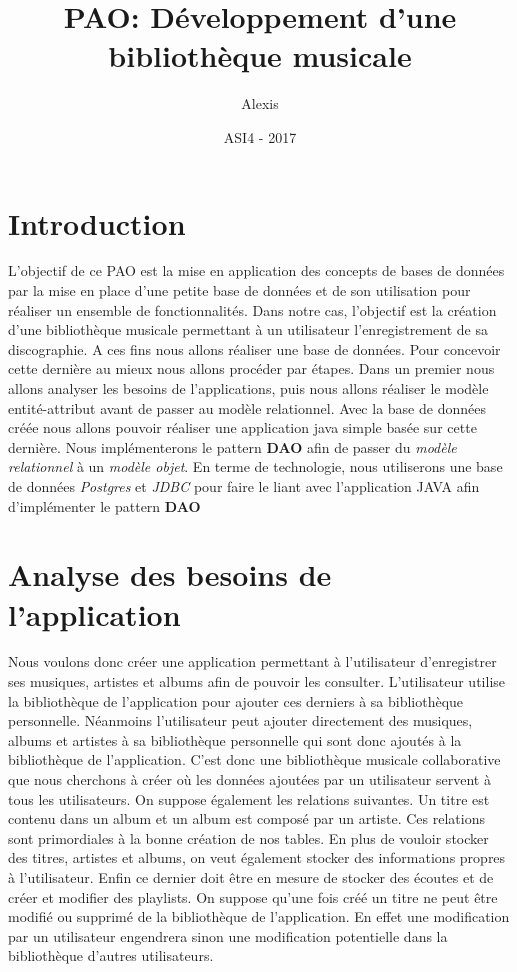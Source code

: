 \documentclass[a4paper,12pt, french]{report}
\title{PAO: Développement d'une bibliothèque musicale}
\author{Alexis \bsc{Durieux}}
\date{ASI4 - 2017}
\begin{document}
\maketitle
\tableofcontents

\chapter*{Introduction}
L'objectif de ce PAO est la mise en application des concepts de bases de données par la mise en place d'une petite base de données et de son utilisation pour réaliser un ensemble de fonctionnalités. Dans notre cas, l'objectif est la création d'une bibliothèque musicale permettant à un utilisateur l'enregistrement de sa discographie. A ces fins nous allons réaliser une base de données. Pour concevoir cette dernière au mieux nous allons procéder par étapes. Dans un premier nous allons analyser les besoins de l'applications, puis nous allons réaliser le modèle entité-attribut avant de passer au modèle relationnel. Avec la base de données créée nous allons pouvoir réaliser une application java simple basée sur cette dernière. Nous implémenterons le pattern \textbf{DAO} afin de passer du \emph{modèle relationnel} à un \emph{modèle objet}. En terme de technologie, nous utiliserons une base de données \emph{Postgres} et \emph{JDBC} pour faire le liant avec l'application JAVA afin d'implémenter le pattern \textbf{DAO}

\chapter{Analyse des besoins de l'application}
Nous voulons donc créer une application permettant à l'utilisateur d'enregistrer ses musiques, artistes et albums afin de pouvoir les consulter. L'utilisateur utilise la bibliothèque de l'application pour ajouter ces derniers à sa  bibliothèque personnelle. Néanmoins l'utilisateur peut ajouter directement des musiques, albums et artistes à sa bibliothèque personnelle qui sont donc ajoutés à la bibliothèque de l'application. C'est donc une bibliothèque musicale collaborative que nous cherchons à créer où les données ajoutées par un utilisateur servent à tous les utilisateurs. On suppose également les relations suivantes. Un titre est contenu dans un album et un album est composé par un artiste. Ces relations sont primordiales à la bonne création de nos tables. En plus de vouloir stocker des titres, artistes et albums, on veut également stocker des informations propres à l'utilisateur. Enfin ce dernier doit être en mesure de stocker des écoutes et de créer et modifier des playlists. On suppose qu'une fois créé un titre ne peut être modifié ou supprimé de la bibliothèque de l'application. En effet une modification par un utilisateur engendrera sinon une modification potentielle dans la bibliothèque d'autres utilisateurs.
\end{document}
